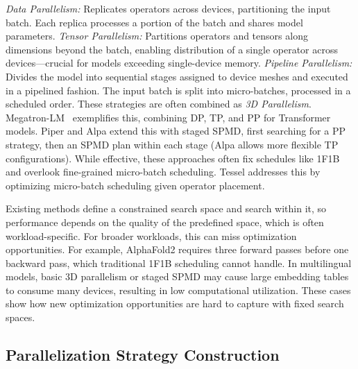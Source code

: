 \documentclass[letterpaper,twocolumn,10pt]{article}
\begin{document}
\textit{Data Parallelism:} Replicates operators across devices, partitioning the input batch. Each replica processes a portion of the batch and shares model parameters. \textit{Tensor Parallelism:} Partitions operators and tensors along dimensions beyond the batch, enabling distribution of a single operator across devices—crucial for models exceeding single-device memory. \textit{Pipeline Parallelism:} Divides the model into sequential stages assigned to device meshes and executed in a pipelined fashion. The input batch is split into micro-batches, processed in a scheduled order. These strategies are often combined as \textit{3D Parallelism}. Megatron-LM~\cite{} exemplifies this, combining DP, TP, and PP for Transformer models. Piper and Alpa extend this with staged SPMD, first searching for a PP strategy, then an SPMD plan within each stage (Alpa allows more flexible TP configurations). While effective, these approaches often fix schedules like 1F1B and overlook fine-grained micro-batch scheduling. Tessel addresses this by optimizing micro-batch scheduling given operator placement.

Existing methods define a constrained search space and search within it, so performance depends on the quality of the predefined space, which is often workload-specific. For broader workloads, this can miss optimization opportunities. For example, AlphaFold2 requires three forward passes before one backward pass, which traditional 1F1B scheduling cannot handle. In multilingual models, basic 3D parallelism or staged SPMD may cause large embedding tables to consume many devices, resulting in low computational utilization. These cases show how new optimization opportunities are hard to capture with fixed search spaces.

\subsection{Parallelization Strategy Construction}

\end{document}
